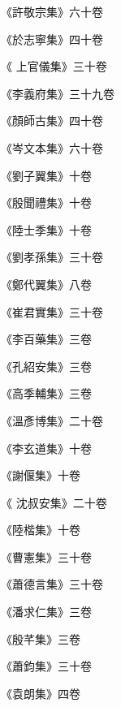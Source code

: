 \begin{pinyinscope}
 《許敬宗集》六十卷



 《於志寧集》四十卷



 《
 上官儀集》三十卷



 《李義府集》三十九卷



 《顏師古集》四十卷



 《岑文本集》六十卷



 《劉子翼集》十卷



 《殷聞禮集》十卷



 《陸士季集》十卷



 《劉孝孫集》三十卷



 《鄭代翼集》八卷



 《崔君實集》三十卷



 《李百藥集》三卷



 《孔紹安集》三卷



 《高季輔集》三卷



 《溫彥博集》二十卷



 《李玄道集》十卷



 《謝偃集》十卷



 《
 沈叔安集》二十卷



 《陸楷集》十卷



 《曹憲集》三十卷



 《蕭德言集》三十卷



 《潘求仁集》三卷



 《殷芊集》三卷



 《蕭鈞集》三十卷



 《袁朗集》四卷




\end{pinyinscope}
